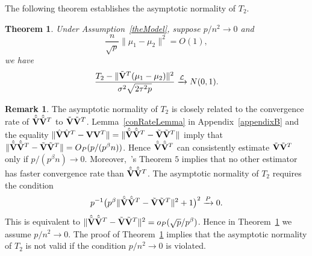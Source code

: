 \documentclass[review]{elsarticle}
\theoremstyle{plain}
\newtheorem{theorem}{\quad\quad Theorem}
\theoremstyle{definition}
\newtheorem{remark}{\quad\quad Remark}
\theoremstyle{remark}
\begin{document}
The following theorem establishes the asymptotic normality of $T_2$.
\begin{theorem}\label{myPanpan}
    Under Assumption~\ref{theModel},
suppose $p/n^2\to 0$ and
    $$\frac{n}{\sqrt{p}}\|\mu_1-\mu_2\|^2=O(1),$$
    we have
\begin{equation*}
        \frac{T_2-\|\tilde{\mathbf{V}}^T(\mu_1-\mu_2)\|^2}{\sigma^2\sqrt{2\tau^2 p}}\xrightarrow{\mathcal{L}}N(0,1).
\end{equation*}
\end{theorem} 
\begin{remark}
The asymptotic normality of $T_2$ is closely related to the convergence rate of $\hat{\tilde{\mathbf{V}}}\hat{\tilde{\mathbf{V}}}^T$ to $\tilde{\mathbf{V}}\tilde{\mathbf{V}}^T$.
    Lemma~\ref{conRateLemma} in Appendix~\ref{appendixB} and the equality $\|\hat{\mathbf{V}}\hat{\mathbf{V}}^T -\mathbf{V} \mathbf{V}^T\|=\|\hat{\tilde{\mathbf{V}}}\hat{\tilde{\mathbf{V}}}^T -\tilde{\mathbf{V}} \tilde{\mathbf{V}}^T\|$ imply that 
    $\|\hat{\tilde{\mathbf{V}}}\hat{\tilde{\mathbf{V}}}^T -\tilde{\mathbf{V}} \tilde{\mathbf{V}}^T\|=O_P(p/(p^{\beta}n))$.
    Hence $\hat{\tilde{\mathbf{V}}}\hat{\tilde{\mathbf{V}}}^T$ can consistently estimate $\tilde{\mathbf{V}}\tilde{\mathbf{V}}^T$ only if $p/(p^{\beta}n)\to 0$.
    Moreover,~\cite{Cai2012Sparse}'s Theorem $5$ implies that no other estimator has faster convergence rate than $\hat{\tilde{\mathbf{V}}}\hat{\tilde{\mathbf{V}}}^T$.
    The asymptotic normality of $T_2$ requires the condition
    $$
    p^{-1}\big(p^{\beta}\|\hat{\tilde{\mathbf{V}}}\hat{\tilde{\mathbf{V}}}^T -\tilde{\mathbf{V}} \tilde{\mathbf{V}}^T\|^2+1\big)^2\xrightarrow{P} 0.
    $$
    This is equivalent to $\|\hat{\tilde{\mathbf{V}}}\hat{\tilde{\mathbf{V}}}^T -\tilde{\mathbf{V}} \tilde{\mathbf{V}}^T\|^2=o_P(\sqrt{p}/p^{\beta})$.
    Hence in Theorem~\ref{myPanpan} we assume $p/n^2\to 0$.
The proof of Theorem~\ref{myPanpan} implies that the asymptotic normality of $T_2$ is not valid if the condition $p/n^2\to 0$ is violated.
\end{remark}
\end{document}
